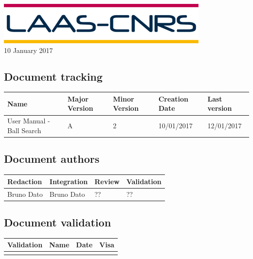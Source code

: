 \documentclass[10pt,a4paper]{article}
\begin{document}
\begin{titlepage}
\includegraphics[scale=0.3]{laas.png} \\[1.1cm] 

\large 10 January 2017
 

\end{titlepage}

\newpage


\subsection*{Document tracking}

\begin{center}
    \begin{tabular}{| l | l | l | l | l |}
    \hline
     \rowcolor{gray} Name & Major Version & Minor Version & Creation Date & Last version \\ \hline
    User Manual - Ball Search & A & 2 & 10/01/2017 & 12/01/2017 \\ \hline
    \end{tabular}
\end{center}


\subsection*{Document authors}

\begin{center}
    \begin{tabular}{| l | l | l | l |}
    \hline
    \rowcolor{gray} Redaction & Integration & Review & Validation \\ \hline
    Bruno Dato & Bruno Dato & ?? & ?? \\  \hline
    \end{tabular}
\end{center}

\subsection*{Document validation}

\begin{center}
    \begin{tabular}{| l | l | l | l |}
    \hline
     \rowcolor{gray} Validation & Name & Date & Visa \\ \hline
    & & & \\
     \hline
    \end{tabular}
\end{center}
\end{document}

